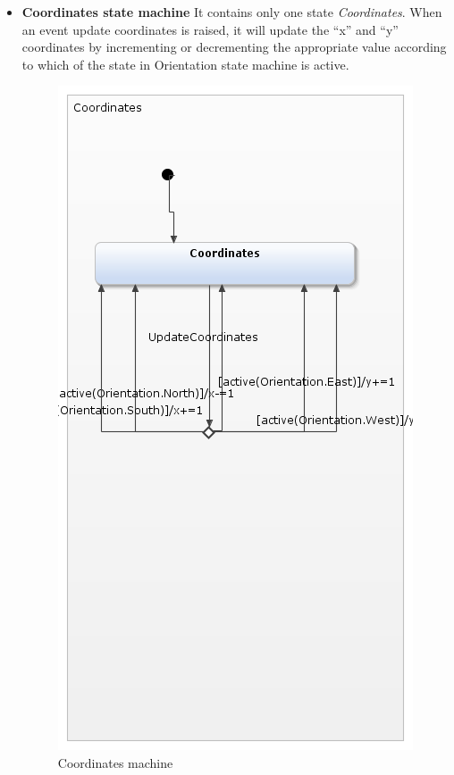 \documentclass[a4paper,12pt,oneside]{book}
\begin{document}
\begin{itemize}
\item \textbf{Coordinates state machine}
It contains only one state \textit{Coordinates}. When an event update coordinates is raised, it will update the “x” and “y” coordinates by incrementing or decrementing the appropriate value according to which of the state in Orientation state machine is active.
	\begin{figure}[h]
	\centering
	\includegraphics[scale=.6]{coordinates.png}
	\caption{Coordinates machine}
\end{figure}


\end{itemize}
\end{document}
